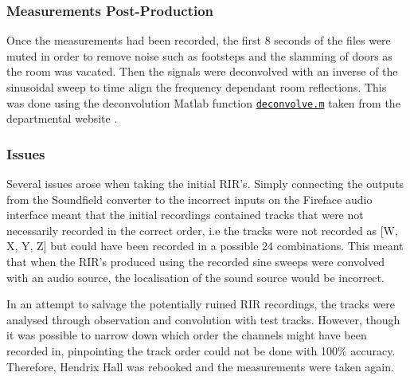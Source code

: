 \documentclass[../../main.tex]{subfiles}
\begin{document}
	\subsubsection{Measurements Post-Production}

		Once the measurements had been recorded, the first 8 seconds of the files were muted in order to remove noise such as footsteps and the slamming of doors as the room was vacated. Then the signals were deconvolved with an inverse of the sinusoidal sweep to time align the frequency dependant room reflections. This was done using the deconvolution Matlab function \href{http://lt669.github.io/code/matlab/html/deconvolve.html}{\texttt{deconvolve.m}} taken from the departmental website \cite{sineSweep}.

	\subsubsection{Issues}
		Several issues arose when taking the initial \ac{RIR}'s. Simply connecting the outputs from the Soundfield converter to the incorrect inputs on the Fireface audio interface meant that the initial recordings contained tracks that were not necessarily recorded in the correct order, i.e the tracks were not recorded as [W, X, Y, Z] but could have been recorded in a possible 24 combinations. This meant that when the \ac{RIR}'s produced using the recorded sine sweeps were convolved with an audio source, the localisation of the sound source would be incorrect.


		In an attempt to salvage the potentially ruined \ac{RIR} recordings, the tracks were analysed through observation and convolution with test tracks. However, though it was possible to narrow down which order the channels might have been recorded in, pinpointing the track order could not be done with 100\% accuracy. Therefore, Hendrix Hall was rebooked and the measurements were taken again.







\end{document}
